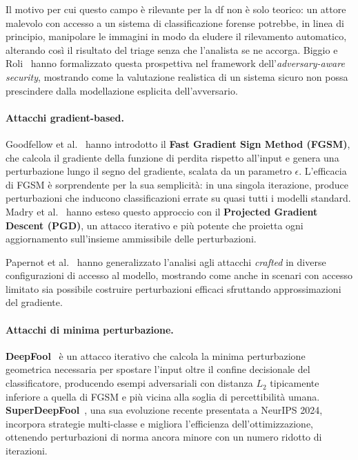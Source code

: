 Il motivo per cui questo campo è rilevante per la \gls{df} non è solo teorico: un attore malevolo con accesso a un sistema di classificazione forense potrebbe, in linea di principio, manipolare le immagini in modo da eludere il rilevamento automatico, alterando così il risultato del triage senza che l'analista se ne accorga. Biggio e Roli~\cite{biggio2018wild} hanno formalizzato questa prospettiva nel framework dell'\textit{adversary-aware security}, mostrando come la valutazione realistica di un sistema sicuro non possa prescindere dalla modellazione esplicita dell'avversario.

\paragraph{Attacchi gradient-based.}
Goodfellow et al.~\cite{goodfellow2015explaining} hanno introdotto il \textbf{Fast Gradient Sign Method (FGSM)}, che calcola il gradiente della funzione di perdita rispetto all'input e genera una perturbazione lungo il segno del gradiente, scalata da un parametro $\epsilon$. L'efficacia di FGSM è sorprendente per la sua semplicità: in una singola iterazione, produce perturbazioni che inducono classificazioni errate su quasi tutti i modelli standard. Madry et al.~\cite{madry2018towards} hanno esteso questo approccio con il \textbf{Projected Gradient Descent (PGD)}, un attacco iterativo e più potente che proietta ogni aggiornamento sull'insieme ammissibile delle perturbazioni.

Papernot et al.~\cite{papernot2016limitations} hanno generalizzato l'analisi agli attacchi \textit{crafted} in diverse configurazioni di accesso al modello, mostrando come anche in scenari con accesso limitato sia possibile costruire perturbazioni efficaci sfruttando approssimazioni del gradiente.

\paragraph{Attacchi di minima perturbazione.}
\textbf{DeepFool}~\cite{moosavi2016deepfool} è un attacco iterativo che calcola la minima perturbazione geometrica necessaria per spostare l'input oltre il confine decisionale del classificatore, producendo esempi adversariali con distanza $L_2$ tipicamente inferiore a quella di FGSM e più vicina alla soglia di percettibilità umana. \textbf{SuperDeepFool}~\cite{zhang2024superdeepfool}, una sua evoluzione recente presentata a NeurIPS 2024, incorpora strategie multi-classe e migliora l'efficienza dell'ottimizzazione, ottenendo perturbazioni di norma ancora minore con un numero ridotto di iterazioni.

